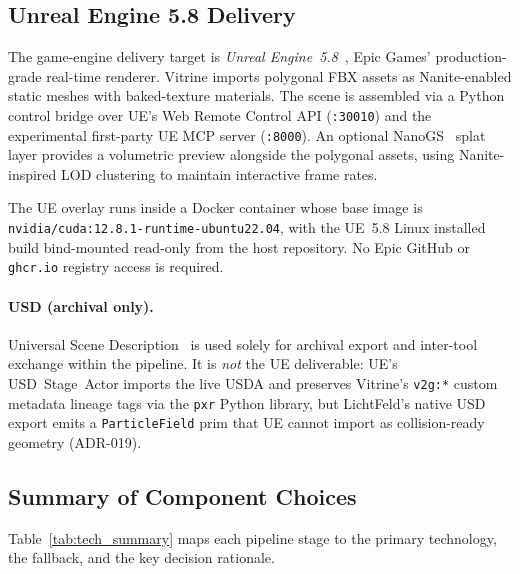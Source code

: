 \subsection{Unreal Engine 5.8 Delivery}
\label{sec:tech:ue}

The game-engine delivery target is \emph{Unreal Engine~5.8}~\cite{epicgames2024_ue5},
Epic Games' production-grade real-time renderer.  Vitrine imports polygonal FBX
assets as Nanite-enabled static meshes with baked-texture materials.  The scene is
assembled via a Python control bridge over UE's Web Remote Control API
(\texttt{:30010}) and the experimental first-party UE MCP server (\texttt{:8000}).
An optional NanoGS~\cite{nanogs2026} splat layer provides a volumetric preview
alongside the polygonal assets, using Nanite-inspired LOD clustering to maintain
interactive frame rates.

The UE overlay runs inside a Docker container whose base image is
\texttt{nvidia/cuda:12.8.1-runtime-ubuntu22.04}, with the UE~5.8 Linux installed
build bind-mounted read-only from the host repository.  No Epic GitHub or
\texttt{ghcr.io} registry access is required.

\paragraph{USD (archival only).}
Universal Scene Description~\cite{pixar2019_usd} is used solely for archival export
and inter-tool exchange within the pipeline.  It is \emph{not} the UE deliverable:
UE's USD~Stage~Actor imports the live USDA and preserves Vitrine's \texttt{v2g:*}
custom metadata lineage tags via the \texttt{pxr} Python library, but LichtFeld's
native USD export emits a \texttt{ParticleField} prim that UE cannot import as
collision-ready geometry (ADR-019).

\subsection{Summary of Component Choices}
\label{sec:tech:summary}

Table~\ref{tab:tech_summary} maps each pipeline stage to the primary technology,
the fallback, and the key decision rationale.

